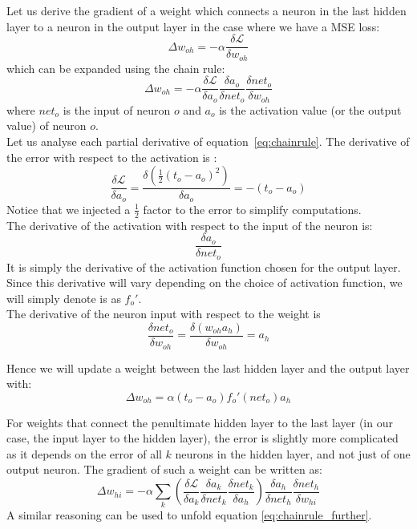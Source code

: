 Let us derive the gradient of a weight which connects a neuron in the 
last hidden layer to a neuron in the output layer in the case
where we have a MSE loss:
$$ \Delta w_{oh} = -\alpha\frac{\delta\mathcal{L}}{\delta w_{oh}}$$
which can be expanded using the chain rule:
\begin{equation}
\Delta w_{oh} = -\alpha
\frac{\delta\mathcal{L}}{\delta a_o}
\frac{\delta a_o}{\delta net_o}
\frac{\delta net_o}{\delta w_{oh}}
	\label{eq:chainrule}
\end{equation}
where $net_o$ is the input of neuron $o$ and $a_o$ is the activation value
(or the output value) of neuron $o$.\\

Let us analyse each partial derivative of equation~\ref{eq:chainrule}.
The derivative of the error with respect to the activation is :
$$ \frac{\delta\mathcal{L}}{\delta a_o} = 
\frac{\delta(\frac{1}{2}(t_o-a_o)^2)}{\delta a_o} = -(t_o-a_o)$$
Notice that we injected a $\frac{1}{2}$ factor to the error to simplify 
computations.\\

The derivative of the activation with respect to the input of the neuron is:
$$ \frac{\delta a_o}{\delta net_o} $$
It is simply the derivative of the activation function chosen for
the output layer. Since this derivative will vary depending on the choice
of activation function, we will simply denote is as $f_o'$.\\


The derivative of the neuron input with respect to the weight is
$$ \frac{\delta net_o}{\delta w_{oh}} = \frac{\delta (w_{oh}a_h)}{\delta w_{oh}}
 = a_h$$

Hence we will update a weight between the last hidden layer and the output
layer with:
$$ \Delta w_{oh} = \alpha (t_o-a_o)f_o'(net_o)a_h$$

For weights that connect the penultimate hidden layer to the last layer (in
our case, the input layer to the hidden layer), the error is slightly more 
complicated as it depends on the error of all $k$ neurons in the hidden layer,
and not just of one output neuron. The gradient of such a weight can be
written as:
\begin{equation}
\Delta w_{hi} = -\alpha
	\sum\limits_k \left(
	\frac{\delta\mathcal{L}}{\delta a_k}
	\frac{\delta a_k}{\delta net_k}
	\frac{\delta net_k}{\delta a_h}
	\right)
\frac{\delta a_h}{\delta net_h}
\frac{\delta net_h}{\delta w_{hi}}
	\label{eq:chainrule_further}
\end{equation}
A similar reasoning can be used to unfold equation \ref{eq:chainrule_further}.\\

